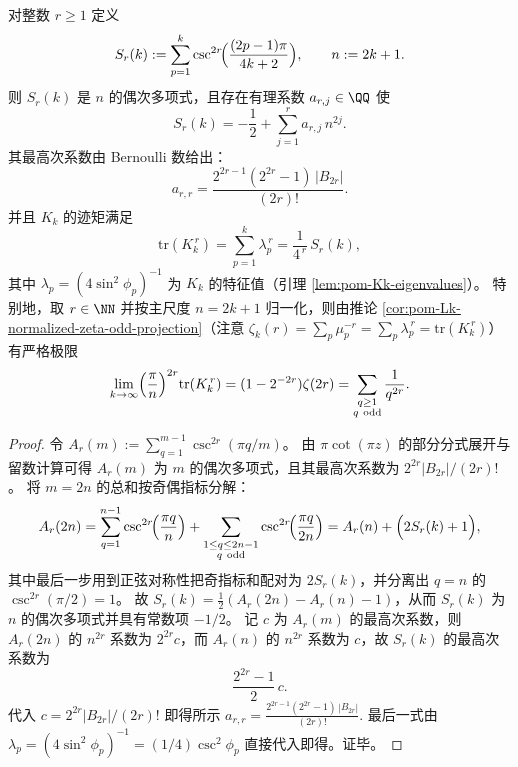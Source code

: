 \begin{proposition}\label{prop:pom-csc-moments-bernoulli}
对整数 \(r\ge 1\) 定义
\[
S_r(k):=\sum_{p=1}^{k}\csc^{2r}\!\Bigl(\frac{(2p-1)\pi}{4k+2}\Bigr),
\qquad
n:=2k+1.
\]
则 \(S_r(k)\) 是 \(n\) 的偶次多项式，且存在有理系数 \(a_{r,j}\in\QQ\) 使
\[
S_r(k)=-\frac12+\sum_{j=1}^{r} a_{r,j}\,n^{2j}.
\]
其最高次系数由 Bernoulli 数给出：
\[
a_{r,r}=\frac{2^{2r-1}(2^{2r}-1)\,|B_{2r}|}{(2r)!}.
\]
并且 \(K_k\) 的迹矩满足
\[
\mathrm{tr}(K_k^{\,r})=\sum_{p=1}^{k}\lambda_p^{\,r}=\frac{1}{4^{\,r}}\,S_r(k),
\]
其中 \(\lambda_p=(4\sin^2\phi_p)^{-1}\) 为 \(K_k\) 的特征值（引理 \ref{lem:pom-Kk-eigenvalues}）。
特别地，取 \(r\in\NN\) 并按主尺度 \(n=2k+1\) 归一化，则由推论 \ref{cor:pom-Lk-normalized-zeta-odd-projection}（注意 \(\zeta_k(r)=\sum_p\mu_p^{-r}=\sum_p\lambda_p^{\,r}=\mathrm{tr}(K_k^{\,r})\)）有严格极限
\[
\lim_{k\to\infty}\Bigl(\frac{\pi}{n}\Bigr)^{2r}\mathrm{tr}(K_k^{\,r})
=(1-2^{-2r})\zeta(2r)
=\sum_{\substack{q\ge 1\\ q\ \mathrm{odd}}}\frac{1}{q^{2r}}.
\]
\end{proposition}
\begin{proof}
令
\(
A_r(m):=\sum_{q=1}^{m-1}\csc^{2r}(\pi q/m)
\)。
由 \(\pi\cot(\pi z)\) 的部分分式展开与留数计算可得 \(A_r(m)\) 为 \(m\) 的偶次多项式，且其最高次系数为 \(2^{2r}|B_{2r}|/(2r)!\)。
将 \(m=2n\) 的总和按奇偶指标分解：
\[
A_r(2n)=\sum_{q=1}^{n-1}\csc^{2r}\!\Bigl(\frac{\pi q}{n}\Bigr)+\sum_{\substack{1\le q\le 2n-1\\ q\ \mathrm{odd}}}\csc^{2r}\!\Bigl(\frac{\pi q}{2n}\Bigr)
=A_r(n)+\Bigl(2S_r(k)+1\Bigr),
\]
其中最后一步用到正弦对称性把奇指标和配对为 \(2S_r(k)\)，并分离出 \(q=n\) 的 \(\csc^{2r}(\pi/2)=1\)。
故
\(
S_r(k)=\frac12(A_r(2n)-A_r(n)-1)
\)，从而 \(S_r(k)\) 为 \(n\) 的偶次多项式并具有常数项 \(-1/2\)。
记 \(c\) 为 \(A_r(m)\) 的最高次系数，则 \(A_r(2n)\) 的 \(n^{2r}\) 系数为 \(2^{2r}c\)，而 \(A_r(n)\) 的 \(n^{2r}\) 系数为 \(c\)，故 \(S_r(k)\) 的最高次系数为
\[
\frac{2^{2r}-1}{2}\,c.
\]
代入 \(c=2^{2r}|B_{2r}|/(2r)!\) 即得所示
\(
a_{r,r}=\frac{2^{2r-1}(2^{2r}-1)\,|B_{2r}|}{(2r)!}
\).
最后一式由 \(\lambda_p=(4\sin^2\phi_p)^{-1}=(1/4)\csc^2\phi_p\) 直接代入即得。证毕。
\end{proof}

